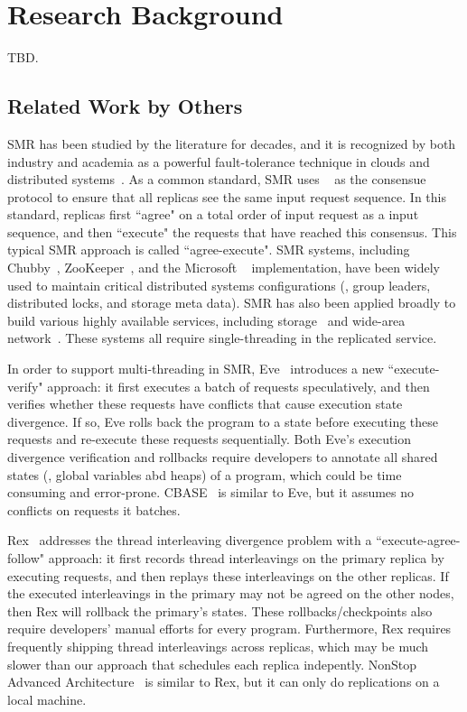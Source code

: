 
\section{Research Background} \label{sec:related}

TBD.

\subsection{Related Work by Others} \label{sec:others-work}

  SMR has been studied by the literature 
for decades, and it is recognized by both industry and academia as a powerful 
fault-tolerance technique in clouds and distributed systems~\cite{lamportclock, 
smr:tutorial}. As a common standard, SMR uses \paxos~\cite{paxos} as the 
consensue protocol to ensure that all replicas see the same input request 
sequence. In this standard, replicas first ``agree" on a total order of input 
request as a input sequence, and then ``execute" the requests that have reached 
this consensus. This typical SMR approach is called ``agree-execute". SMR 
systems, including Chubby~\cite{chubby:osdi}, ZooKeeper~\cite{zookeeper}, and 
the Microsoft \paxos~\cite{paxos} implementation, have been widely used to 
maintain critical distributed systems configurations (\eg, group leaders, 
distributed locks, and storage meta data). SMR has also been applied broadly to 
build various highly available services, including 
storage~\cite{paxos:datastore} and wide-area 
network~\cite{mencius:osdi08}. These systems all require single-threading in 
the replicated service.

In order to support multi-threading in SMR, Eve~\cite{eve:osdi12} introduces a 
new ``execute-verify" approach: it first executes a batch of requests 
speculatively, and then verifies whether these requests have conflicts that 
cause execution state divergence. If so, Eve rolls back the program to a state 
before executing these requests and re-execute these requests sequentially. 
Both Eve's execution divergence verification and rollbacks require developers 
to annotate all shared states (\eg, global variables abd heaps) of a program, 
which could be time consuming and error-prone. CBASE~\cite{cbase:dsn04} is 
similar to Eve, but it assumes no conflicts on requests it batches.

Rex~\cite{rex:eurosys14} addresses the thread interleaving divergence problem 
with a ``execute-agree-follow" approach: it first records thread interleavings 
on the primary replica by executing requests, and then replays these 
interleavings on the other replicas. If the executed interleavings in the 
primary may not be agreed on the other nodes, then Rex will rollback the 
primary's states. These rollbacks/checkpoints also require developers' manual 
efforts for every program. Furthermore, Rex requires frequently shipping thread 
interleavings across replicas, which may be much slower than our \smt approach 
that schedules each replica indepently. NonStop Advanced 
Architecture~\cite{nonstop:dsn05} is similar to Rex, but it can only do 
replications on a local machine.

